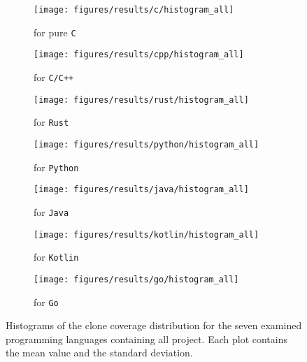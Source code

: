 \begin{figure}[p]
	\centering
	\begin{subfigure}[t]{0.49\textwidth}
		\texttt{[image: figures/results/c/histogram\_all]}
		\caption{for pure \texttt{C}}
		\label{fig:histo_all_c}
	\end{subfigure}
	\hfill
	\begin{subfigure}[t]{0.49\textwidth}
		\texttt{[image: figures/results/cpp/histogram\_all]}
		\caption{for \texttt{C/C++}}
		\label{fig:histo_all_cpp}
	\end{subfigure}
	\begin{subfigure}[t]{0.49\textwidth}
		\texttt{[image: figures/results/rust/histogram\_all]}
		\caption{for \texttt{Rust}}
		\label{fig:histo_all_rust}
	\end{subfigure}
	\begin{subfigure}[t]{0.49\textwidth}
		\texttt{[image: figures/results/python/histogram\_all]}
		\caption{for \texttt{Python}}
		\label{fig:histo_all_python}
	\end{subfigure}
	\begin{subfigure}[t]{0.49\textwidth}
		\texttt{[image: figures/results/java/histogram\_all]}
		\caption{for \texttt{Java}}
		\label{fig:histo_all_java}
	\end{subfigure}
	\begin{subfigure}[t]{0.49\textwidth}
		\texttt{[image: figures/results/kotlin/histogram\_all]}
		\caption{for \texttt{Kotlin}}
		\label{fig:histo_all_kotlin}
	\end{subfigure}
	\begin{subfigure}[t]{0.49\textwidth}
		\texttt{[image: figures/results/go/histogram\_all]}
		\caption{for \texttt{Go}}
		\label{fig:histo_all_go}
	\end{subfigure}
	\caption{Histograms of the clone coverage distribution for the seven examined programming languages containing all project. Each plot contains the mean value and the standard deviation.}
	\label{fig:histo_all}
\end{figure}


